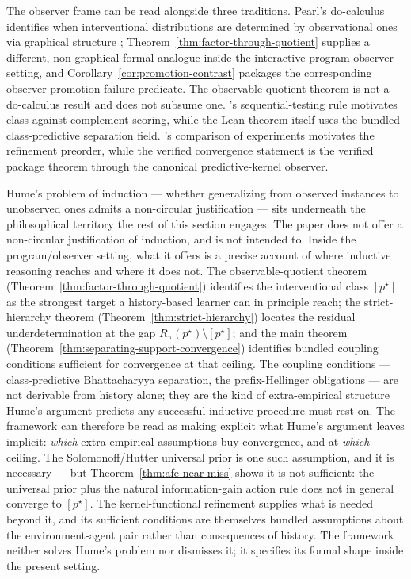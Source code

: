 \documentclass[11pt]{article}
\theoremstyle{definition}
\theoremstyle{remark}
\theoremstyle{plain}
\theoremstyle{definition}
\begin{document}
The observer frame can be read alongside three traditions. Pearl's do-calculus identifies when interventional distributions are determined by observational ones via graphical structure \citep{Pearl2009}; Theorem~\ref{thm:factor-through-quotient} supplies a different, non-graphical formal analogue inside the interactive program-observer setting, and Corollary~\ref{cor:promotion-contrast} packages the corresponding observer-promotion failure predicate. The observable-quotient theorem is not a do-calculus result and does not subsume one. \citet{Chernoff1959}'s sequential-testing rule motivates class-against-complement scoring, while the Lean theorem itself uses the bundled class-predictive separation field. \citet{Blackwell1953}'s comparison of experiments motivates the refinement preorder, while the verified convergence statement is the verified package theorem through the canonical predictive-kernel observer.

Hume's problem of induction \citep{Hume1748} --- whether generalizing from observed instances to unobserved ones admits a non-circular justification --- sits underneath the philosophical territory the rest of this section engages. The paper does not offer a non-circular justification of induction, and is not intended to. Inside the program/observer setting, what it offers is a precise account of where inductive reasoning reaches and where it does not. The observable-quotient theorem (Theorem~\ref{thm:factor-through-quotient}) identifies the interventional class $[p^\star]$ as the strongest target a history-based learner can in principle reach; the strict-hierarchy theorem (Theorem~\ref{thm:strict-hierarchy}) locates the residual underdetermination at the gap $R_\pi(p^\star)\setminus[p^\star]$; and the main theorem (Theorem~\ref{thm:separating-support-convergence}) identifies bundled coupling conditions sufficient for convergence at that ceiling. The coupling conditions --- class-predictive Bhattacharyya separation, the prefix-Hellinger obligations --- are not derivable from history alone; they are the kind of extra-empirical structure Hume's argument predicts any successful inductive procedure must rest on. The framework can therefore be read as making explicit what Hume's argument leaves implicit: \emph{which} extra-empirical assumptions buy convergence, and at \emph{which} ceiling. The Solomonoff/Hutter universal prior is one such assumption, and it is necessary --- but Theorem~\ref{thm:afe-near-miss} shows it is not sufficient: the universal prior plus the natural information-gain action rule does not in general converge to $[p^\star]$. The kernel-functional refinement supplies what is needed beyond it, and its sufficient conditions are themselves bundled assumptions about the environment-agent pair rather than consequences of history. The framework neither solves Hume's problem nor dismisses it; it specifies its formal shape inside the present setting.
\end{document}
